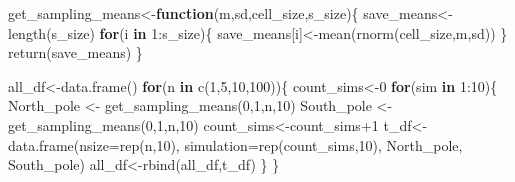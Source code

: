 \documentclass[
  letterpaper,
  DIV=11,
  numbers=noendperiod]{scrreprt}
\newenvironment{Shaded}{\begin{snugshade}}{\end{snugshade}}
\newcommand{\AttributeTok}[1]{\textcolor[rgb]{0.40,0.45,0.13}{#1}}
\newcommand{\ControlFlowTok}[1]{\textcolor[rgb]{0.00,0.23,0.31}{\textbf{#1}}}
\newcommand{\DecValTok}[1]{\textcolor[rgb]{0.68,0.00,0.00}{#1}}
\newcommand{\FunctionTok}[1]{\textcolor[rgb]{0.28,0.35,0.67}{#1}}
\newcommand{\NormalTok}[1]{\textcolor[rgb]{0.00,0.23,0.31}{#1}}
\newcommand{\OtherTok}[1]{\textcolor[rgb]{0.00,0.23,0.31}{#1}}
\newcommand{\SpecialCharTok}[1]{\textcolor[rgb]{0.37,0.37,0.37}{#1}}
\begin{document}
\begin{Shaded}
\begin{Highlighting}[]
\NormalTok{get\_sampling\_means}\OtherTok{\textless{}{-}}\ControlFlowTok{function}\NormalTok{(m,sd,cell\_size,s\_size)\{}
\NormalTok{  save\_means}\OtherTok{\textless{}{-}}\FunctionTok{length}\NormalTok{(s\_size)}
  \ControlFlowTok{for}\NormalTok{(i }\ControlFlowTok{in} \DecValTok{1}\SpecialCharTok{:}\NormalTok{s\_size)\{}
\NormalTok{    save\_means[i]}\OtherTok{\textless{}{-}}\FunctionTok{mean}\NormalTok{(}\FunctionTok{rnorm}\NormalTok{(cell\_size,m,sd))}
\NormalTok{  \}}
  \FunctionTok{return}\NormalTok{(save\_means)}
\NormalTok{\}}

\NormalTok{all\_df}\OtherTok{\textless{}{-}}\FunctionTok{data.frame}\NormalTok{()}
\ControlFlowTok{for}\NormalTok{(n }\ControlFlowTok{in} \FunctionTok{c}\NormalTok{(}\DecValTok{1}\NormalTok{,}\DecValTok{5}\NormalTok{,}\DecValTok{10}\NormalTok{,}\DecValTok{100}\NormalTok{))\{}
\NormalTok{  count\_sims}\OtherTok{\textless{}{-}}\DecValTok{0}
  \ControlFlowTok{for}\NormalTok{(sim }\ControlFlowTok{in} \DecValTok{1}\SpecialCharTok{:}\DecValTok{10}\NormalTok{)\{}
\NormalTok{    North\_pole }\OtherTok{\textless{}{-}} \FunctionTok{get\_sampling\_means}\NormalTok{(}\DecValTok{0}\NormalTok{,}\DecValTok{1}\NormalTok{,n,}\DecValTok{10}\NormalTok{)}
\NormalTok{    South\_pole }\OtherTok{\textless{}{-}} \FunctionTok{get\_sampling\_means}\NormalTok{(}\DecValTok{0}\NormalTok{,}\DecValTok{1}\NormalTok{,n,}\DecValTok{10}\NormalTok{)}
\NormalTok{      count\_sims}\OtherTok{\textless{}{-}}\NormalTok{count\_sims}\SpecialCharTok{+}\DecValTok{1}
\NormalTok{      t\_df}\OtherTok{\textless{}{-}}\FunctionTok{data.frame}\NormalTok{(}\AttributeTok{nsize=}\FunctionTok{rep}\NormalTok{(n,}\DecValTok{10}\NormalTok{),}
                       \AttributeTok{simulation=}\FunctionTok{rep}\NormalTok{(count\_sims,}\DecValTok{10}\NormalTok{),}
\NormalTok{                       North\_pole,}
\NormalTok{                       South\_pole)}
\NormalTok{      all\_df}\OtherTok{\textless{}{-}}\FunctionTok{rbind}\NormalTok{(all\_df,t\_df)}
\NormalTok{  \}}
\NormalTok{\}}



\end{Highlighting}
\end{Shaded}
\end{document}
